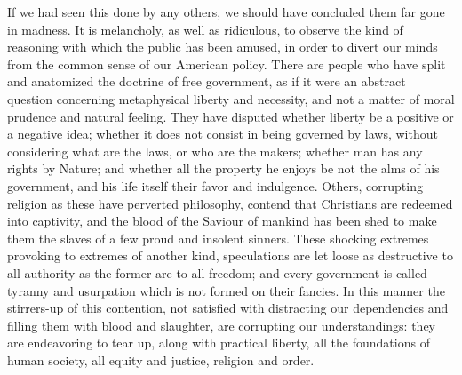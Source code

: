 If we had seen this done by any others, we should have concluded them far gone in madness. It is melancholy, as well as ridiculous, to observe the kind of reasoning with which the public has been amused, in order to divert our minds from the common sense of our American policy. There are people who have split and anatomized the doctrine of free government, as if it were an abstract question concerning metaphysical liberty and necessity, and not a matter of moral prudence and natural feeling. They have disputed whether liberty be a positive or a negative idea; whether it does not consist in being governed by laws, without considering what are the laws, or who are the makers; whether man has any rights by Nature; and whether all the property he enjoys be not the alms of his government, and his life itself their favor and indulgence. Others, corrupting religion as these have perverted philosophy, contend that Christians are redeemed into captivity, and the blood of the Saviour of mankind has been shed to make them the slaves of a few proud and insolent sinners. These shocking extremes provoking to extremes of another kind, speculations are let loose as destructive to all authority as the former are to all freedom; and every government is called tyranny and usurpation which is not formed on their fancies. In this manner the stirrers-up of this contention, not satisfied with distracting our dependencies and filling them with blood and slaughter, are corrupting our understandings: they are endeavoring to tear up, along with practical liberty, all the foundations of human society, all equity and justice, religion and order.

